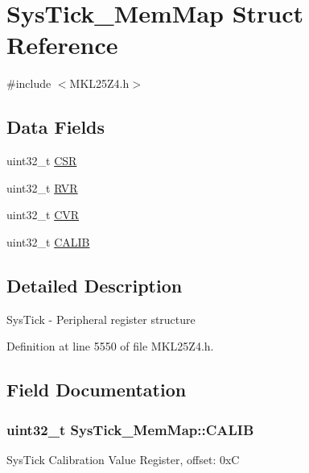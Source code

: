 \hypertarget{struct_sys_tick___mem_map}{}\section{Sys\+Tick\+\_\+\+Mem\+Map Struct Reference}
\label{struct_sys_tick___mem_map}


{\ttfamily \#include $<$M\+K\+L25\+Z4.\+h$>$}

\subsection*{Data Fields}
\begin{DoxyCompactItemize}
\item 
uint32\+\_\+t \hyperlink{struct_sys_tick___mem_map_aec23689880afd46876916055403e867a}{C\+SR}
\item 
uint32\+\_\+t \hyperlink{struct_sys_tick___mem_map_a3f2018b492fd4bc1d141a718d499e50f}{R\+VR}
\item 
uint32\+\_\+t \hyperlink{struct_sys_tick___mem_map_a508dd628bc347f199e7baf4b1bfbfa0d}{C\+VR}
\item 
uint32\+\_\+t \hyperlink{struct_sys_tick___mem_map_a9e83c524401ad455c84d5a9738ca3d4d}{C\+A\+L\+IB}
\end{DoxyCompactItemize}


\subsection{Detailed Description}
Sys\+Tick -\/ Peripheral register structure 

Definition at line 5550 of file M\+K\+L25\+Z4.\+h.



\subsection{Field Documentation}
\subsubsection[{\texorpdfstring{C\+A\+L\+IB}{CALIB}}]{\setlength{\rightskip}{0pt plus 5cm}uint32\+\_\+t Sys\+Tick\+\_\+\+Mem\+Map\+::\+C\+A\+L\+IB}\hypertarget{struct_sys_tick___mem_map_a9e83c524401ad455c84d5a9738ca3d4d}{}\label{struct_sys_tick___mem_map_a9e83c524401ad455c84d5a9738ca3d4d}
Sys\+Tick Calibration Value Register, offset\+: 0xC 

